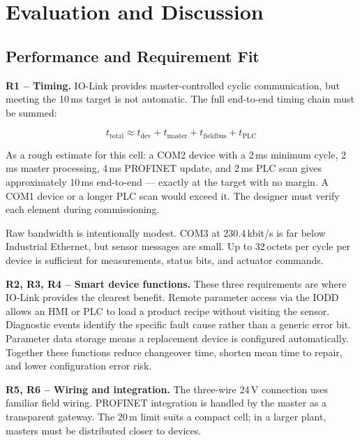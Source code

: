 \documentclass[conference]{IEEEtran}
\begin{document}
\section{Evaluation and Discussion}
\label{sec:eval}

\subsection{Performance and Requirement Fit}

\textbf{R1 -- Timing.}
IO-Link provides master-controlled cyclic communication, but meeting
the 10\,ms target is not automatic. The full end-to-end timing chain
must be summed:

\begin{equation}
t_\text{total} \approx t_\text{dev} + t_\text{master} +
                        t_\text{fieldbus} + t_\text{PLC}
\label{eq:timing}
\end{equation}

As a rough estimate for this cell: a COM2 device with a 2\,ms minimum
cycle, 2\,ms master processing, 4\,ms PROFINET update, and 2\,ms PLC
scan gives approximately 10\,ms end-to-end --- exactly at the target
with no margin. A COM1 device or a longer PLC scan would exceed it.
The designer must verify each element during commissioning.

Raw bandwidth is intentionally modest. COM3 at 230.4\,kbit/s is far
below Industrial Ethernet, but sensor messages are small. Up to
32\,octets per cycle per device is sufficient for measurements, status
bits, and actuator commands.

\textbf{R2, R3, R4 -- Smart device functions.}
These three requirements are where IO-Link provides the clearest
benefit. Remote parameter access via the IODD allows an HMI or PLC to
load a product recipe without visiting the sensor. Diagnostic events
identify the specific fault cause rather than a generic error bit.
Parameter data storage means a replacement device is configured
automatically. Together these functions reduce changeover time, shorten
mean time to repair, and lower configuration error risk.

\textbf{R5, R6 -- Wiring and integration.}
The three-wire 24\,V connection uses familiar field wiring. PROFINET
integration is handled by the master as a transparent gateway. The
20\,m limit suits a compact cell; in a larger plant, masters must be
distributed closer to devices.
\end{document}
